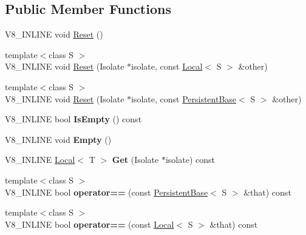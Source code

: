 \subsection*{Public Member Functions}
\begin{DoxyCompactItemize}
\item 
V8\+\_\+\+I\+N\+L\+I\+NE void \mbox{\hyperlink{classv8_1_1PersistentBase_a174bb1e45b18fd4eeaee033622825bb8}{Reset}} ()
\item 
{\footnotesize template$<$class S $>$ }\\V8\+\_\+\+I\+N\+L\+I\+NE void \mbox{\hyperlink{classv8_1_1PersistentBase_a11164f0dfc9a16d79809236e7a9670aa}{Reset}} (Isolate $\ast$isolate, const \mbox{\hyperlink{classv8_1_1Local}{Local}}$<$ S $>$ \&other)
\item 
{\footnotesize template$<$class S $>$ }\\V8\+\_\+\+I\+N\+L\+I\+NE void \mbox{\hyperlink{classv8_1_1PersistentBase_af6b8f929b0cbaa83341df48ca3b03ef5}{Reset}} (Isolate $\ast$isolate, const \mbox{\hyperlink{classv8_1_1PersistentBase}{Persistent\+Base}}$<$ S $>$ \&other)
\item 
\mbox{\label{classv8_1_1PersistentBase_aa4d270d1946260813a4fba08121fdbd1}} 
V8\+\_\+\+I\+N\+L\+I\+NE bool {\bfseries Is\+Empty} () const
\item 
\mbox{\label{classv8_1_1PersistentBase_abb8a06471ea86de1731a3c94a879b00e}} 
V8\+\_\+\+I\+N\+L\+I\+NE void {\bfseries Empty} ()
\item 
\mbox{\label{classv8_1_1PersistentBase_ae943e4070eb5d18493575b37a0cfb6f8}} 
V8\+\_\+\+I\+N\+L\+I\+NE \mbox{\hyperlink{classv8_1_1Local}{Local}}$<$ T $>$ {\bfseries Get} (Isolate $\ast$isolate) const
\item 
\mbox{\label{classv8_1_1PersistentBase_a2a267a582638e2acc864f672b25e4b9c}} 
{\footnotesize template$<$class S $>$ }\\V8\+\_\+\+I\+N\+L\+I\+NE bool {\bfseries operator==} (const \mbox{\hyperlink{classv8_1_1PersistentBase}{Persistent\+Base}}$<$ S $>$ \&that) const
\item 
\mbox{\label{classv8_1_1PersistentBase_a4a2ec8bcbe0fe95cac2e3c17b800557e}} 
{\footnotesize template$<$class S $>$ }\\V8\+\_\+\+I\+N\+L\+I\+NE bool {\bfseries operator==} (const \mbox{\hyperlink{classv8_1_1Local}{Local}}$<$ S $>$ \&that) const

\end{DoxyCompactItemize}
